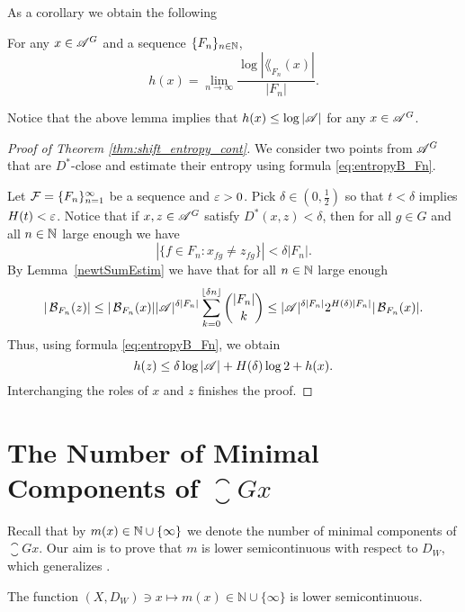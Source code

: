 \noindent
As a corollary we obtain the following
\begin{lem}\label{entropyAdoG}
For any $x\in\mathscr{A}^G$ and a \Folner sequence $\{F_n\}_{n\in\mathbb{N}}$, 
\begin{equation}\label{eq:entropyB_Fn}
h(x)=\lim_{n\to\infty}\frac{\log|\lang_{F_n}(x)|}{|F_n|}.
\end{equation}
\end{lem}

\noindent
Notice that the above lemma implies that $h(x)\leq\log|\mathscr{A}|$ for any $x\in\mathscr{A}^G$.



\begin{proof}[Proof of Theorem \ref{thm:shift_entropy_cont}]
We consider two points from $\mathscr{A}^G$ that are $D^*$-close and estimate their entropy using formula \eqref{eq:entropyB_Fn}.

Let $\operatorname{\mathcal{F}}=\{F_n\}_{n=1}^\infty$ be a \Folner sequence and $\varepsilon>0$.
Pick $\delta\in(0,\frac{1}{2})$ so that $t<\delta$ implies $H(t)<\varepsilon$. Notice that if $x,z\in \mathscr{A}^G$ satisfy
$D^*(x,z)<\delta$, then for all $g\in G$ and all $n\in\mathbb{N}$ large enough we have
\[
|\{f\in F_n : x_{fg}\neq z_{fg}\}|<\delta |F_n|.
\] 
By Lemma~\ref{newtSumEstim} we have that for all $n\in\mathbb{N}$ large enough
\begin{equation*}
|\operatorname{\mathcal{B}}_{F_n}(z)|\leq |\operatorname{\mathcal{B}}_{F_n}(x)||\mathscr{A}|^{\delta|F_n|}\sum_{k=0}^{\lfloor \delta n\rfloor}{|F_n|\choose k} 
\leq|\mathscr{A}|^{\delta|F_n|} 2^{H(\delta) |F_n|} |\operatorname{\mathcal{B}}_{F_n}(x)|.
\end{equation*}
Thus, using formula \eqref{eq:entropyB_Fn}, we obtain
\[
h(z)\leq \delta\log{|\mathscr{A}|}+H(\delta)\log 2+h(x).
\]
Interchanging the roles of $x$ and $z$ finishes the proof.
\end{proof}




\section{The Number of Minimal Components of ${\closure{Gx}}$}\label{sec:m}

Recall that by $m(x)\in\mathbb{N}\cup\{\infty\}$ we denote the number of minimal components of $\closure{Gx}$. Our aim is to prove that $m$ is lower semicontinuous with respect to $D_W$, which generalizes \cite[Theorem 1]{DI88}.

\begin{thm}\label{thm:mxCont}
The function $(X,D_W)\ni x \mapsto m(x)\in \mathbb N\cup\{\infty\}$ is lower semicontinuous.
\end{thm}

